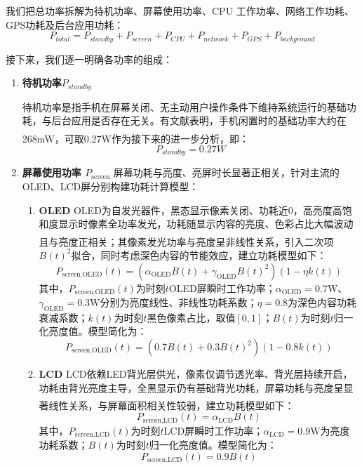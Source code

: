 \documentclass{mcmthesis}  %
\newcommand{\upcite}[1]{\textsuperscript{\textsuperscript{\cite{#1}}}}
\begin{document}
	我们把总功率拆解为待机功率、屏幕使用功率、CPU 工作功率、网络工作功耗、GPS功耗及后台应用功耗：
	\begin{equation}
		P_{total}=P_{standby}+P_{screen}+P_{CPU}+P_{network}+P_{GPS}+P_{background}
	\end{equation}
	
	接下来，我们逐一明确各功率的组成：
	\begin{enumerate}[label=\arabic*.]
		\item \textbf{待机功率$P_{standby}$}
		
		待机功率是指手机在屏幕关闭、无主动用户操作条件下维持系统运行的基础功耗，与后台应用是否存在无关。有文献表明，手机闲置时的基础功率大约在268mW，可取0.27W作为接下来的进一步分析\upcite{1}，即：
		\begin{equation}
			P_{standby}=0.27W
		\end{equation}
		
		
		\item \textbf{屏幕使用功率 $P_{\text{screen}}$}
		屏幕功耗与亮度、亮屏时长显著正相关，针对主流的OLED、LCD屏分别构建功耗计算模型：
		\begin{enumerate}[label=(\arabic*)]
			\item \textbf{OLED}
			OLED为自发光器件，黑态显示像素关闭、功耗近0，高亮度高饱和度显示时像素全功率发光，功耗随显示内容的亮度、色彩占比大幅波动且与亮度正相关\upcite{2}；其像素发光功率与亮度呈非线性关系\upcite{3}，引入二次项$B(t)^2$拟合，同时考虑深色内容的节能效应，建立功耗模型如下：
			\begin{equation}
				P_{\text{screen,OLED}}(t) = \left( \alpha_{\text{OLED}} B(t) + \gamma_{\text{OLED}} B(t)^2 \right) \left( 1 - \eta k(t) \right)
			\end{equation}
			其中，$P_{\text{screen,OLED}}(t)$为时刻$t$OLED屏瞬时工作功率；$\alpha_{\text{OLED}}=0.7\mathrm{W}$、$\gamma_{\text{OLED}}=0.3\mathrm{W}$分别为亮度线性、非线性功耗系数；$\eta=0.8$为深色内容功耗衰减系数；$k(t)$为时刻$t$黑色像素占比，取值$[0,1]$；$B(t)$为时刻$t$归一化亮度值。模型简化为：
			\begin{equation}
				P_{\text{screen,OLED}}(t) =\left( 0.7B(t) + 0.3B(t)^2 \right) \left( 1 - 0.8k(t) \right)
			\end{equation}
			
			\item \textbf{LCD}
			LCD依赖LED背光层供光，像素仅调节透光率、背光层持续开启，功耗由背光亮度主导，全黑显示仍有基础背光功耗，屏幕功耗与亮度呈显著线性关系\upcite{4}，与屏幕面积相关性较弱，建立功耗模型如下：
			\begin{equation}
				P_{\text{screen,LCD}}(t) = \alpha_{\text{LCD}} B(t)
			\end{equation}
			其中，$P_{\text{screen,LCD}}(t)$为时刻$t$LCD屏瞬时工作功率；$\alpha_{\text{LCD}}=0.9\mathrm{W}$为亮度功耗系数；$B(t)$为时刻$t$归一化亮度值。模型简化为：
			\begin{equation}
				P_{\text{screen,LCD}}(t) = 0.9 B(t)
			\end{equation}
			

\end{enumerate}
\end{enumerate}
\end{document}
